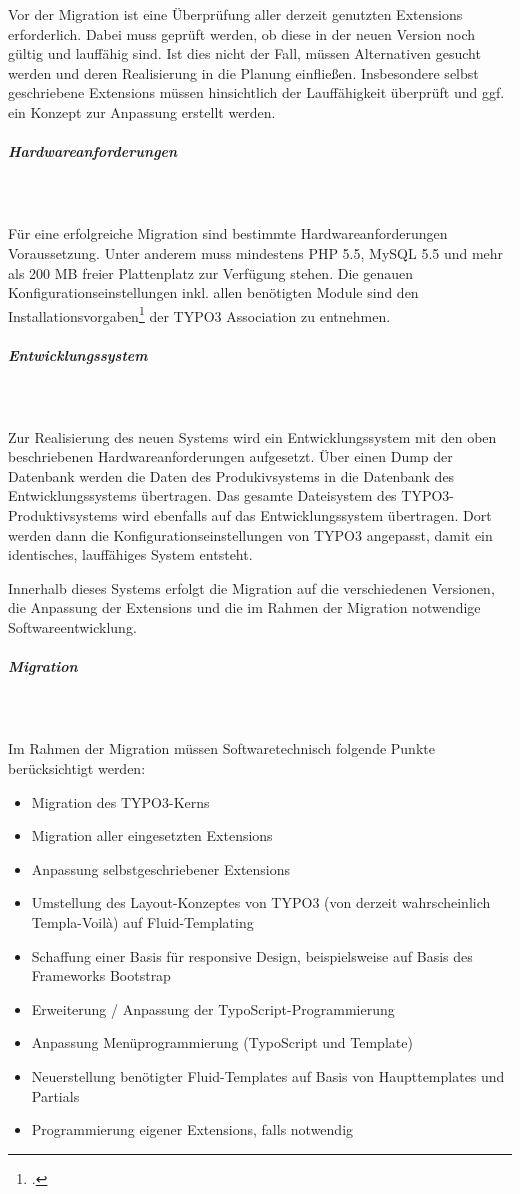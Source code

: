 Vor der Migration ist eine Überprüfung aller derzeit genutzten Extensions erforderlich. Dabei muss geprüft werden, ob diese in der neuen Version noch gültig und lauffähig sind. Ist dies nicht der Fall, müssen Alternativen gesucht werden und deren Realisierung in die Planung einfließen. Insbesondere selbst geschriebene Extensions müssen hinsichtlich der Lauffähigkeit überprüft und ggf. ein Konzept zur Anpassung erstellt werden.

\subparagraph{Hardwareanforderungen}\mbox{}\\\\
Für eine erfolgreiche Migration sind bestimmte Hardwareanforderungen Voraussetzung. Unter anderem muss mindestens PHP 5.5, MySQL 5.5 und mehr als 200 MB freier Plattenplatz zur Verfügung stehen. Die genauen Konfigurationseinstellungen inkl. allen benötigten Module sind den Installationsvorgaben\footcite{typo3_installing_url} der TYPO3 Association zu entnehmen.

\subparagraph{Entwicklungssystem}\mbox{}\\\\
Zur Realisierung des neuen Systems wird ein Entwicklungssystem mit den oben beschriebenen Hardwareanforderungen aufgesetzt. Über einen Dump der Datenbank werden die Daten des Produkivsystems in die Datenbank des Entwicklungssystems übertragen. Das gesamte Dateisystem des TYPO3-Produktivsystems wird ebenfalls auf das Entwicklungssystem übertragen. Dort werden dann die Konfigurationseinstellungen von TYPO3 angepasst, damit ein identisches, lauffähiges System entsteht.

Innerhalb dieses Systems erfolgt die Migration auf die verschiedenen Versionen, die Anpassung der Extensions und die im Rahmen der Migration notwendige Softwareentwicklung.

\subparagraph{Migration}\mbox{}\\\\
Im Rahmen der Migration müssen Softwaretechnisch folgende Punkte berücksichtigt werden:
\begin{itemize}
\item Migration des TYPO3-Kerns
\item Migration aller eingesetzten Extensions
\item Anpassung selbstgeschriebener Extensions
\item Umstellung des Layout-Konzeptes von TYPO3 (von derzeit wahrscheinlich Templa-Voilà) auf Fluid-Templating
\item Schaffung einer Basis für responsive Design, beispielsweise auf Basis des Frameworks Bootstrap
\item Erweiterung / Anpassung der TypoScript-Programmierung
\item Anpassung Menüprogrammierung (TypoScript und Template)
\item Neuerstellung benötigter Fluid-Templates auf Basis von Haupttemplates und Partials
\item Programmierung eigener Extensions, falls notwendig
\end{itemize}

